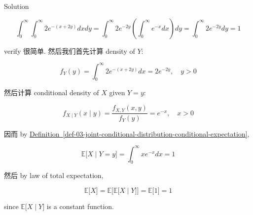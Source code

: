 \documentclass{qlnotes-export}
\begin{document}
\begin{qlsolution}{Solution}

\[\int_{0}^{\infty}\int_{0}^{\infty}2e^{- (x + 2y)}dxdy = \int_{0}^{\infty}2e^{- 2y}\left( {\int_{0}^{\infty}e^{- x}dx} \right)dy = \int_{0}^{\infty}2e^{- 2y}dy = 1\]

verify 很简单. 然后我们首先计算 density of \(Y\):

\[f_{Y}(y) = \int_{0}^{\infty}2e^{- (x + 2y)}dx = 2e^{- 2y},\quad y > 0\]

然后计算 conditional density of \(X\) given \(Y = y\):

\[f_{X \mid Y}(x \mid y) = \frac{f_{X,Y}(x,y)}{f_{Y}(y)} = e^{- x},\quad x > 0\]

因而 by \hyperref[def-03-joint-conditional-distribution-conditional-expectation]{Definition~\ref*{def-03-joint-conditional-distribution-conditional-expectation}},

\[{\mathbb{E}}\lbrack X \mid Y = y\rbrack = \int_{0}^{\infty}xe^{- x}dx = 1\]

然后 by law of total expectation,

\[\left. {\mathbb{E}}\lbrack X\rbrack = {\mathbb{E}}\lbrack{\mathbb{E}}\lbrack X \middle| Y\rbrack\rbrack = {\mathbb{E}}\lbrack 1\rbrack = 1 \right.\]

since \(\left. {\mathbb{E}}\lbrack X \middle| Y\rbrack \right.\) is a constant function.

\end{qlsolution}
\end{document}
